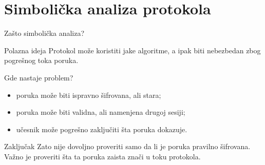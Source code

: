 \documentclass[aspectratio=1610]{beamer}
\begin{document}

\section{Simbolička analiza protokola}

\begin{frame}[t]{Zašto simbolička analiza?}
\small

\begin{block}{Polazna ideja}
Protokol može koristiti jake algoritme, a ipak biti nebezbedan zbog pogrešnog toka poruka.
\end{block}

\vspace{0.25em}

\begin{block}{Gde nastaje problem?}
\begin{itemize}
    \item poruka može biti ispravno šifrovana, ali stara;
    \item poruka može biti validna, ali namenjena drugoj sesiji;
    \item učesnik može pogrešno zaključiti šta poruka dokazuje.
\end{itemize}
\end{block}

\vspace{0.25em}

\begin{alertblock}{Zaključak}
Zato nije dovoljno proveriti samo da li je poruka pravilno šifrovana. Važno je proveriti šta ta poruka zaista znači u toku protokola.
\end{alertblock}

\end{frame}
\end{document}
